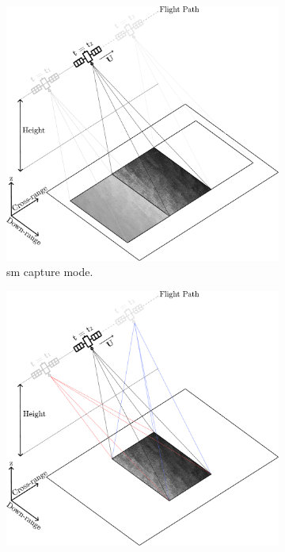 

\begin{figure} [H]
    \centering
    \begin{subfigure}{0.48\textwidth}
        \includegraphics[width=\textwidth]{Figures/Theory/stripmap.pdf}
        \caption{\acf{sm} capture mode.}
        \label{fig:theory.stripmap}
    \end{subfigure}   
    \begin{subfigure}{0.48\textwidth}
        \includegraphics[width=\textwidth]{Figures/Theory/spotlight.pdf}

\end{subfigure}
\end{figure}
